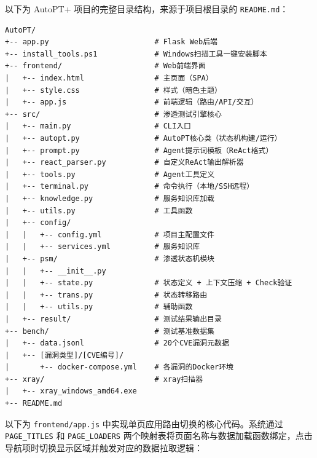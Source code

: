 以下为 AutoPT+ 项目的完整目录结构，来源于项目根目录的 \texttt{README.md}：

\begin{Verbatim}[mathescape=false]
AutoPT/
+-- app.py                        # Flask Web后端
+-- install_tools.ps1             # Windows扫描工具一键安装脚本
+-- frontend/                     # Web前端界面
|   +-- index.html                # 主页面（SPA）
|   +-- style.css                 # 样式（暗色主题）
|   +-- app.js                    # 前端逻辑（路由/API/交互）
+-- src/                          # 渗透测试引擎核心
|   +-- main.py                   # CLI入口
|   +-- autopt.py                 # AutoPT核心类（状态机构建/运行）
|   +-- prompt.py                 # Agent提示词模板（ReAct格式）
|   +-- react_parser.py           # 自定义ReAct输出解析器
|   +-- tools.py                  # Agent工具定义
|   +-- terminal.py               # 命令执行（本地/SSH远程）
|   +-- knowledge.py              # 服务知识库加载
|   +-- utils.py                  # 工具函数
|   +-- config/
|   |   +-- config.yml            # 项目主配置文件
|   |   +-- services.yml          # 服务知识库
|   +-- psm/                      # 渗透状态机模块
|   |   +-- __init__.py
|   |   +-- state.py              # 状态定义 + 上下文压缩 + Check验证
|   |   +-- trans.py              # 状态转移路由
|   |   +-- utils.py              # 辅助函数
|   +-- result/                   # 测试结果输出目录
+-- bench/                        # 测试基准数据集
|   +-- data.jsonl                # 20个CVE漏洞元数据
|   +-- [漏洞类型]/[CVE编号]/
|       +-- docker-compose.yml    # 各漏洞的Docker环境
+-- xray/                         # xray扫描器
|   +-- xray_windows_amd64.exe
+-- README.md
\end{Verbatim}

\label{app:router}

以下为 \texttt{frontend/app.js} 中实现单页应用路由切换的核心代码。系统通过 \texttt{PAGE\_TITLES} 和 \texttt{PAGE\_LOADERS} 两个映射表将页面名称与数据加载函数绑定，点击导航项时切换显示区域并触发对应的数据拉取逻辑：

